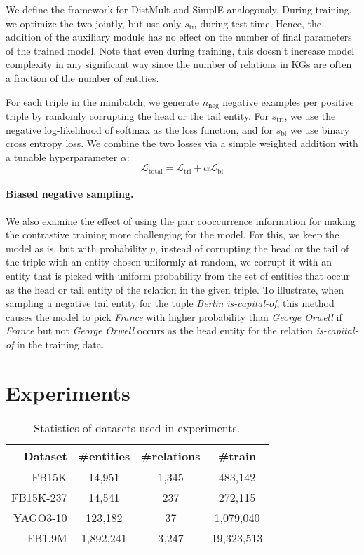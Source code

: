 \documentclass[11pt,a4paper, dvipsnames]{article}
\begin{document}
We define the framework for DistMult and SimplE analogously. During training, we optimize the two jointly, but use only $s_\text{tri}$ during test time. Hence, the addition of the auxiliary module has no effect on the number of final parameters of the trained model. Note that even during training, this doesn't increase model complexity in any significant way since the number of relations in KGs are often a fraction of the number of entities. 
 
 For each triple in the minibatch, we generate $n_{\text{neg}}$ negative examples per positive triple by randomly corrupting the head or the tail entity. For $s_{\text{tri}}$, we use the negative log-likelihood of softmax as the loss function, and for $s_{\text{bi}}$ we use binary cross entropy loss. We combine the two losses via a simple weighted addition with a tunable hyperparameter $\alpha$:
 \begin{equation}
     \mathcal{L}_\text{total} = \mathcal{L}_\text{tri} + \alpha\mathcal{L}_\text{bi}
 \end{equation}
 
 \paragraph{Biased negative sampling.} We also examine the effect of using the pair cooccurrence information for making the contrastive training more challenging for the model. For this, we keep the model as is, but with probability $p$, instead of corrupting the head or the tail of the triple with an entity chosen uniformly at random, we corrupt it with an entity that is picked with uniform probability from the set of entities that occur as the head or tail entity of the relation in the given triple. To illustrate, when sampling a negative tail entity for the tuple \textit{Berlin is-capital-of}, this method causes the model to pick \textit{France} with higher probability than \textit{George Orwell} if \textit{France} but not \textit{George Orwell} occurs as the head entity for the relation \textit{is-capital-of} in the training data. 

 \section{Experiments} \label{sec:experiments}

  \begin{table}[t!] \centering
    \small
    \begin{tabular}{r | c c c}
          \textbf{Dataset} & \textbf{\#entities} & \textbf{\#relations} & \textbf{\#train} \\
         \hline 
        FB15K & 14,951 & 1,345 & 483,142 \\
        \hline
        FB15K-237 & 14,541 & 237 & 272,115 \\
        \hline
        YAGO3-10 & 123,182 & 37 & 1,079,040 \\
        \hline
        FB1.9M & 1,892,241 & 3,247 & 19,323,513 \\
    \end{tabular}
    \caption{Statistics of datasets used in experiments.}
    \label{tab:datasets}
\end{table}
\end{document}
